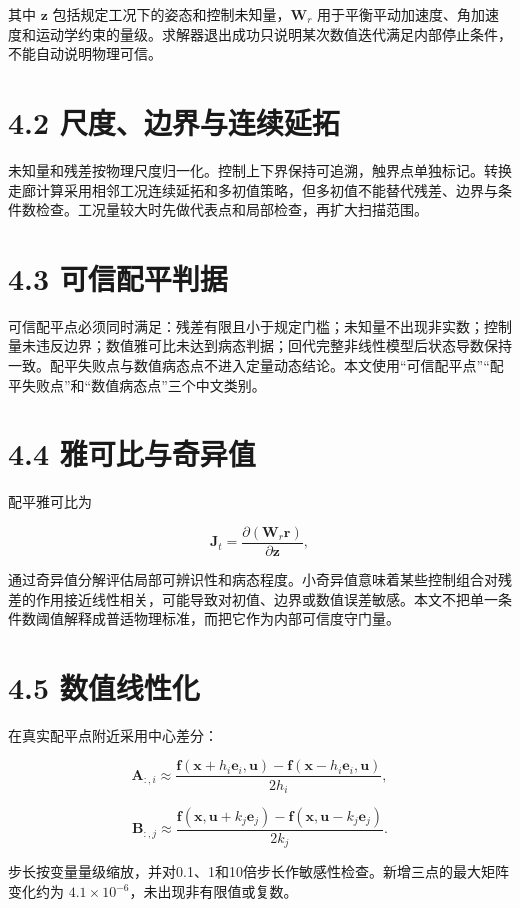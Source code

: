 \documentclass[UTF8,12pt,openany]{ctexbook}
\begin{document}
其中 $\mathbf{z}$ 包括规定工况下的姿态和控制未知量，$\mathbf{W}_r$ 用于平衡平动加速度、角加速度和运动学约束的量级。求解器退出成功只说明某次数值迭代满足内部停止条件，不能自动说明物理可信。

\section{4.2 尺度、边界与连续延拓}

未知量和残差按物理尺度归一化。控制上下界保持可追溯，触界点单独标记。转换走廊计算采用相邻工况连续延拓和多初值策略，但多初值不能替代残差、边界与条件数检查。工况量较大时先做代表点和局部检查，再扩大扫描范围。

\section{4.3 可信配平判据}

可信配平点必须同时满足：残差有限且小于规定门槛；未知量不出现非实数；控制量未违反边界；数值雅可比未达到病态判据；回代完整非线性模型后状态导数保持一致。配平失败点与数值病态点不进入定量动态结论。本文使用“可信配平点”“配平失败点”和“数值病态点”三个中文类别。

\section{4.4 雅可比与奇异值}

配平雅可比为

$$\mathbf{J}_t=\frac{\partial(\mathbf{W}_r\mathbf{r})}{\partial\mathbf{z}},$$

通过奇异值分解评估局部可辨识性和病态程度。小奇异值意味着某些控制组合对残差的作用接近线性相关，可能导致对初值、边界或数值误差敏感。本文不把单一条件数阈值解释成普适物理标准，而把它作为内部可信度守门量。

\section{4.5 数值线性化}

在真实配平点附近采用中心差分：

$$\mathbf{A}_{:,i}\approx
\frac{\mathbf{f}(\mathbf{x}+h_i\mathbf{e}_i,\mathbf{u})
-\mathbf{f}(\mathbf{x}-h_i\mathbf{e}_i,\mathbf{u})}{2h_i},$$

$$\mathbf{B}_{:,j}\approx
\frac{\mathbf{f}(\mathbf{x},\mathbf{u}+k_j\mathbf{e}_j)
-\mathbf{f}(\mathbf{x},\mathbf{u}-k_j\mathbf{e}_j)}{2k_j}.$$

步长按变量量级缩放，并对0.1、1和10倍步长作敏感性检查。新增三点的最大矩阵变化约为 $4.1\times10^{-6}$，未出现非有限值或复数。
\end{document}
